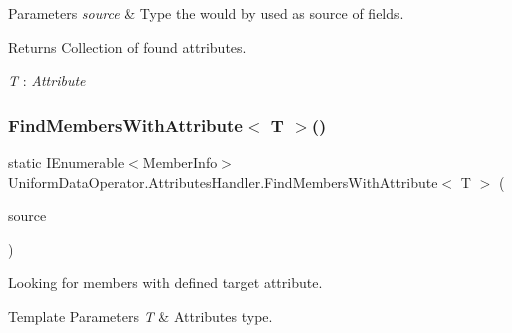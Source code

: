 \begin{DoxyParams}{Parameters}
{\em source} & Type the would by used as source of fields.\\
\hline
\end{DoxyParams}
\begin{DoxyReturn}{Returns}
Collection of found attributes.
\end{DoxyReturn}
\begin{Desc}
\item[Type Constraints]\begin{description}
\item[{\em T} : {\em Attribute}]\end{description}
\end{Desc}
\mbox{\label{class_uniform_data_operator_1_1_attributes_handler_a5e4058aa0ace67c90606d7974690cafe}} 
\subsubsection{\texorpdfstring{Find\+Members\+With\+Attribute$<$ T $>$()}{FindMembersWithAttribute< T >()}\hspace{0.1cm}{\footnotesize\ttfamily [2/2]}}
{\footnotesize\ttfamily static I\+Enumerable$<$Member\+Info$>$ Uniform\+Data\+Operator.\+Attributes\+Handler.\+Find\+Members\+With\+Attribute$<$ T $>$ (\begin{DoxyParamCaption}\item[{I\+Enumerable$<$ Member\+Info $>$}]{source }\end{DoxyParamCaption})\hspace{0.3cm}{\ttfamily [static]}}



Looking for members with defined target attribute. 


\begin{DoxyTemplParams}{Template Parameters}
{\em T} & Attribute\textquotesingle{}s type.\\
\hline
\end{DoxyTemplParams}

